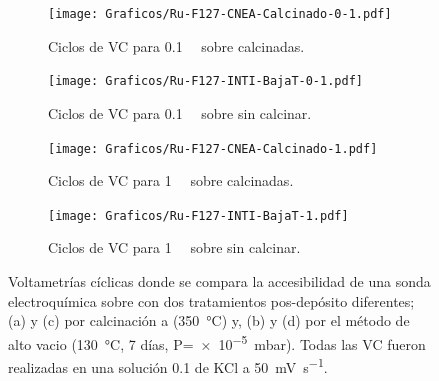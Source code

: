 	  		\begin{figure}[bt!]
		 	
		 	\begin{subfigure}[t]{0.5\textwidth}
		          	\texttt{[image: Graficos/Ru-F127-CNEA-Calcinado-0-1.pdf]}
		          	\vspace*{-6mm}
		         	\caption{Ciclos de VC para \ru\space \SI{0.1}{\milli\Molar} sobre \pdmF\space calcinadas.}
		          	\vspace*{3mm}
		          	\label{fig:cal_01mM}
		          	\end{subfigure}
		    \begin{subfigure}[t]{0.5\textwidth}
		          	\texttt{[image: Graficos/Ru-F127-INTI-BajaT-0-1.pdf]}
		         	\vspace*{-6mm}
		         	\caption{Ciclos de VC para \ru\space \SI{0.1}{\milli\Molar} sobre \pdmF\space sin calcinar.}
		      		\vspace*{3mm}
		      		\label{fig:vac_01mM}
		      		\end{subfigure}
		    \begin{subfigure}[t]{0.5\textwidth}
		          	\texttt{[image: Graficos/Ru-F127-CNEA-Calcinado-1.pdf]}
		         	\vspace*{-6mm}
		         	\caption{Ciclos de VC para \ru\space \SI{1}{\milli\Molar} sobre \pdmF\space calcinadas.}
		            \vspace*{3mm}
		            \label{fig:cal_1mM}
		            \end{subfigure}
		    \begin{subfigure}[t]{0.5\textwidth}
		          	\texttt{[image: Graficos/Ru-F127-INTI-BajaT-1.pdf]}
		         	\vspace*{-6mm}
		         	\caption{Ciclos de VC para \ru\space \SI{1}{\milli\Molar} sobre \pdmF\space sin calcinar.}
		    		\vspace*{3mm}
		    		\label{fig:vac_1mM}
		    		\end{subfigure}
		      	 	\caption[Voltagrama comparativo SF calcinados/alto vacío I]{Voltametrías cíclicas donde se compara la accesibilidad de una sonda electroquímica sobre \pdmF\space con dos tratamientos pos-depósito diferentes; (a) y (c) por calcinación a (\SI{350}{\celsius}) y, (b) y (d) por el método de alto vacio (\SI{130}{\celsius}, 7 días, P=\SI{e-5}{\milli\bar}). Todas las VC fueron realizadas en una solución \SI{0.1}{\Molar} de KCl a \SI{50}{\milli\volt\per\second}.}
		      		\label{fig:comp-calc-vacio}
	      \end{figure}

